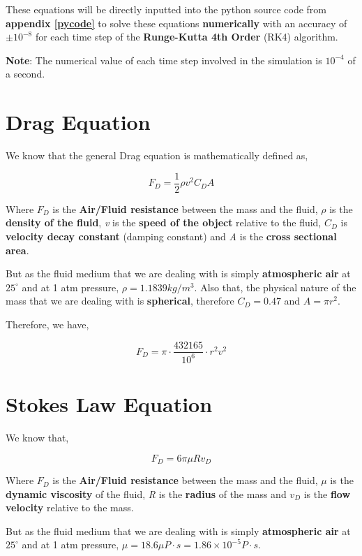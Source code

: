     {These equations will be directly inputted into the python source code from \textbf{appendix \ref{pycode}} to solve these equations \textbf{numerically} with an accuracy of $\pm 10^{-8}$ for each time step of the \textbf{Runge-Kutta 4th Order} (RK4) algorithm.}
           
	{\textbf{Note}: The numerical value of each time step involved in the simulation is $10^{-4}$ of a second.}
           
\section{{Drag Equation}}
            
    {We know that the general Drag equation is mathematically defined as,}
            
        $$F_D = \frac{1}{2}\rho v^2C_DA$$
           
    {Where $F_D$ is the \textbf{Air/Fluid resistance} between the mass and the fluid, $\rho$ is the \textbf{density of the fluid}, \textit{v} is the \textbf{speed of the object} relative to the fluid, $C_D$ is \textbf{velocity decay constant} (damping constant) and \textit{A} is the \textbf{cross sectional area}.}
            
    {But as the fluid medium that we are dealing with is simply \textbf{atmospheric air} at $25^\circ$ and at 1 atm pressure, $\rho = 1.1839 kg/m^3$. Also that, the physical nature of the mass that we are dealing with is \textbf{spherical}, therefore $C_D = 0.47$ and $A = \pi r^2$.}
            
    {Therefore, we have,}
            
        $$F_D = \pi\cdot\frac{432165}{10^{6}}\cdot r^2v^2$$
            
\section{{Stokes Law Equation}}
            
    {We know that,}
            
        $$F_D = 6\pi\mu Rv_D$$
            
    {Where $F_D$ is the \textbf{Air/Fluid resistance} between the mass and the fluid, $\mu$ is the \textbf{dynamic viscosity} of the fluid, \textit{R} is the \textbf{radius} of the mass and $v_D$ is the \textbf{flow velocity} relative to the mass.}
            
    {But as the fluid medium that we are dealing with is simply \textbf{atmospheric air} at $25^\circ$ and at 1 atm pressure, $\mu = 18.6 \mu P\cdot s = 1.86 \times 10^{-5} P\cdot s$.}
            

